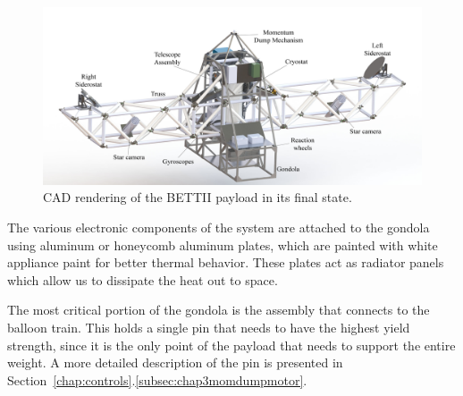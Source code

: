 \begin{figure}[!ht]
	\centering
	\includegraphics[width=\textwidth]{Figures/BETTII-annotated.jpg} 
	\caption[BETTII Rendering]{CAD rendering of the BETTII payload in its final state.}
	\label{fig:BETTIICAD}
    \end{figure}



The various electronic components of the system are attached to the gondola using aluminum or honeycomb aluminum plates, which are painted with white appliance paint for better thermal behavior. These plates act as radiator panels which allow us to dissipate the heat out to space.

The most critical portion of the gondola is the assembly that connects to the balloon train. This holds a single pin that needs to have the highest yield strength, since it is the only point of the payload that needs to support the entire weight. A more detailed description of the pin is presented in Section~\ref{chap:controls}.\ref{subsec:chap3momdumpmotor}.

